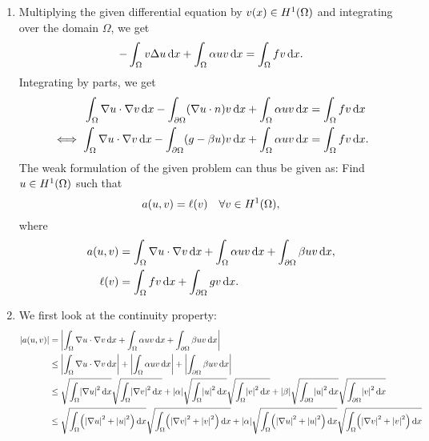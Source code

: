 \documentclass[english]{exercise}
\begin{document}
	\begin{enumerate}
		\item Multiplying the given differential equation by \(v\parentheses*{x} \in H^1\parentheses*{\Omega}\) and integrating over the domain \(\Omega\), we get
		\[
			-\int_\Omega v\Delta u\mathop{\mathrm{d}\!} x + \int_\Omega \alpha uv\mathop{\mathrm{d}\!} x = \int_\Omega fv\mathop{\mathrm{d}\!} x.
		\]
		Integrating by parts, we get
		\begin{align*}
			\int_\Omega \nabla u \cdot \nabla v\d x - \int_{\partial\Omega}\parentheses*{\nabla u \cdot n}v\d x + \int_\Omega \alpha uv\d x &= \int_\Omega fv\d x\\
			\iff \int_\Omega \nabla u \cdot \nabla v\d x - \int_{\partial\Omega}\parentheses*{g - \beta u}v\d x + \int_\Omega \alpha uv\d x &= \int_\Omega fv\d x.
		\end{align*}
		The weak formulation of the given problem can thus be given as:
		Find \(u \in H^1\parentheses*{\Omega}\) such that
		\[
			a\parentheses*{u, v} = \ell\parentheses*{v} \quad \forall v \in H^1\parentheses*{\Omega},
		\]
		where
		\begin{align*}
			a\parentheses*{u, v} &= \int_\Omega \nabla u \cdot \nabla v\d x + \int_\Omega \alpha uv\d x + \int_{\partial\Omega}\beta uv\d x,\\
			\ell\parentheses*{v} &= \int_\Omega fv\d x + \int_{\partial\Omega}gv\d x.
		\end{align*}
		\item We first look at the continuity property:
		\begin{align*}
			\absolute*{a\parentheses*{u, v}} &= \absolute*{\int_\Omega \nabla u \cdot \nabla v\d x + \int_\Omega \alpha uv\d x + \int_{\partial\Omega}\beta uv\d x}\\
			&\le \absolute*{\int_\Omega \nabla u \cdot \nabla v\d x} + \absolute*{\int_\Omega \alpha uv\d x} + \absolute*{\int_{\partial\Omega}\beta uv\d x}\\
			&\le \sqrt{\int_\Omega \absolute*{\nabla u}^2 \d x}\sqrt{\int_\Omega \absolute*{\nabla v}^2 \d x} + \absolute*{\alpha}\sqrt{\int_\Omega \absolute*{u}^2 \d x}\sqrt{\int_\Omega \absolute*{v}^2 \d x} + \absolute*{\beta}\sqrt{\int_{\partial\Omega}\absolute*{u}^2 \d x}\sqrt{\int_{\partial\Omega}\absolute*{v}^2 \d x}\\
			&\le \sqrt{\int_\Omega \parentheses*{\absolute*{\nabla u}^2 + \absolute*{u}^2}\d x}\sqrt{\int_\Omega \parentheses*{\absolute*{\nabla v}^2 + \absolute*{v}^2}\d x} + \absolute*{\alpha}\sqrt{\int_\Omega \parentheses*{\absolute*{\nabla u}^2 + \absolute*{u}^2}\d x}\sqrt{\int_\Omega \parentheses*{\absolute*{\nabla v}^2 + \absolute*{v}^2}\d x}\\

\end{align*}
\end{enumerate}
\end{document}
